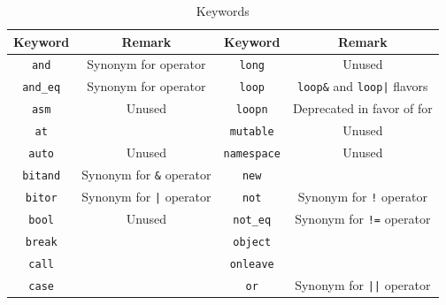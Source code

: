 \documentclass[openright,twoside,12pt]{report}
\newcommand   {\floatpos}          {htbp}
\begin{document}
\renewcommand{\baselinestretch}{.85}
\begin{table}[\floatpos]
  \caption{Keywords}
  \label{tab:keywords}
  \centering
  \begin{tabular}{|c|c||c|c|}
    \hline
    Keyword                       & Remark                                  &
    Keyword                       & Remark                                  \\
    \hline
    \lstinline"and"               & Synonym for  operator                   &
    \lstinline"long"              & Unused                                  \\
    \lstinline"and_eq"            & Synonym for  operator                   &
    \lstinline"loop"              & \lstinline|loop&| and
                                    \lstinline-loop|- flavors               \\
    \lstinline"asm"               & Unused                                  &
    \lstinline"loopn"             & Deprecated in favor of for              \\
    \lstinline"at"                &                                         &
    \lstinline"mutable"           & Unused                                  \\
    \lstinline"auto"              & Unused                                  &
    \lstinline"namespace"         & Unused                                  \\
    \lstinline"bitand"            & Synonym for \lstinline|&| operator      &
    \lstinline"new"               &                                         \\
    \lstinline"bitor"             & Synonym for \lstinline-|- operator      &
    \lstinline"not"               & Synonym for \lstinline|!| operator      \\
    \lstinline"bool"              & Unused                                  &
    \lstinline"not_eq"            & Synonym for \lstinline|!=| operator     \\
    \lstinline"break"             &                                         &
    \lstinline"object"            &                                         \\
    \lstinline"call"              &                                         &
    \lstinline"onleave"           &                                         \\
    \lstinline"case"              &                                         &
    \lstinline"or"                & Synonym for \lstinline-||- operator     \\

\end{tabular}
\end{table}
\end{document}
